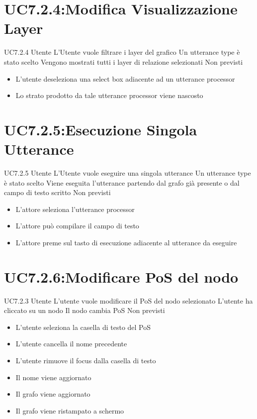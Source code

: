 \documentclass[../AnalisideiRequisiti.tex]{subfiles}
\begin{document}
\section{UC7.2.4:Modifica Visualizzazione Layer}
\UserCase
{UC7.2.4}
{Utente}
{}
{L'Utente vuole filtrare i layer del grafico}
{Un utterance type è stato scelto }
{Vengono mostrati tutti i layer di relazione selezionati}
{Non previsti}
{\begin{itemize}
		\item{} L'utente deseleziona una select box adiacente ad un utterance processor
		\item{} Lo strato prodotto da tale utterance processor viene nascosto
\end{itemize}
}
\section{UC7.2.5:Esecuzione Singola Utterance}
\UserCase
{UC7.2.5}
{Utente}
{}
{L'Utente vuole eseguire una singola utterance}
{Un utterance type è stato scelto  }
{Viene eseguita l'utterance partendo dal grafo già presente o dal campo di testo scritto}
{Non previsti}
{\begin{itemize}
				\item{} L'attore seleziona l'utterance processor
		\item{} L'attore può compilare il campo di testo
		\item{} L'attore preme sul tasto di esecuzione adiacente al utterance da eseguire 
	\end{itemize}
}

\section{UC7.2.6:Modificare PoS del nodo}
\UserCase
{UC7.2.3}
{Utente}
{}
{L'utente vuole modificare il PoS del nodo selezionato}
{L'utente ha cliccato su un nodo}
{Il nodo cambia PoS}
{Non previsti}
{\begin{itemize}
		\item{} L'utente seleziona la casella di testo del PoS
		\item{} L'utente cancella il nome precedente
		\item{} L'utente rimuove il focus dalla casella di testo
		\item{} Il nome viene aggiornato
		\item{} Il grafo viene aggiornato 
		\item{} Il grafo viene ristampato a schermo 
\end{itemize}}
\end{document}
